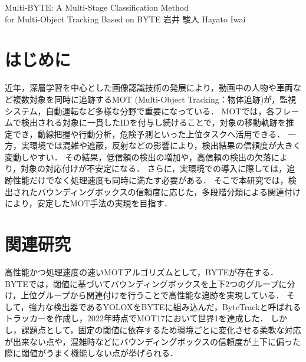 \documentclass[a4paper,10pt,twocolumn,uplatex]{jsarticle}
\date{28}
\begin{document}
{Multi-BYTE: A Multi-Stage Classification Method \\ for Multi-Object Tracking Based on BYTE}
{岩井 駿人}
{Hayato Iwai}

\section{はじめに}
近年，深層学習を中心とした画像認識技術の発展により，動画中の人物や車両など複数対象を同時に追跡するMOT (Multi-Object Tracking：物体追跡)が，監視システム，自動運転など多様な分野で重要になっている．
MOTでは，各フレームで検出される対象に一貫したIDを付与し続けることで，対象の移動軌跡を推定でき，動線把握や行動分析，危険予測といった上位タスクへ活用できる．
一方，実環境では混雑や遮蔽，反射などの影響により，検出結果の信頼度が大きく変動しやすい．
その結果，低信頼の検出の増加や，高信頼の検出の欠落により，対象の対応付けが不安定になる．
さらに，実環境での導入に際しては，追跡性能だけでなく処理速度も同時に満たす必要がある．
そこで本研究では，検出されたバウンディングボックスの信頼度に応じた，多段階分類による関連付けにより，安定したMOT手法の実現を目指す．
\section{関連研究}
高性能かつ処理速度の速いMOTアルゴリズムとして，BYTE\cite{ByteTrack}が存在する．
BYTEでは，閾値に基づいてバウンディングボックスを上下2つのグループに分け，上位グループから関連付けを行うことで高性能な追跡を実現している．
そして，強力な検出器であるYOLOXをBYTEに組み込んだ，ByteTrackと呼ばれるトラッカーを作成し，2022年時点でMOT17において世界1を達成した．
しかし，課題点として，固定の閾値に依存するため環境ごとに変化させる柔軟な対応が出来ない点や，混雑時などにバウンディングボックスの信頼度が上下に偏った際に閾値がうまく機能しない点が挙げられる．
\end{document}
